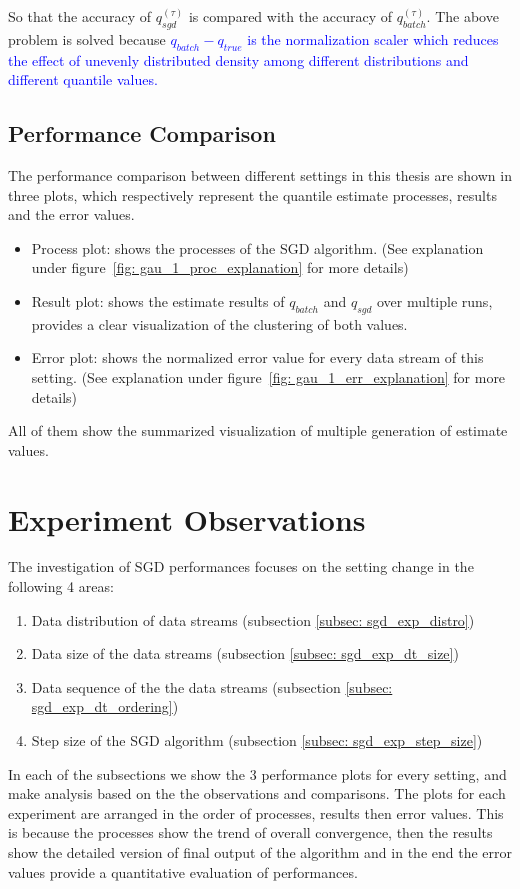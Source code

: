 So that the accuracy of $q_{sgd}^{(\tau)}$ is compared with the accuracy of $q_{batch}^{(\tau)}$. The above problem is solved because 
\textcolor{blue}{
    $
    q_{batch} - q_{true}
    $
    is the normalization scaler which reduces the effect of unevenly distributed density among different distributions and different quantile values.
}

\subsection{Performance Comparison}
The performance comparison between different settings in this thesis are shown in three plots, which respectively represent
the quantile estimate processes, results and the error values.
\begin{itemize}
    \item Process plot: shows the processes of the SGD algorithm. (See explanation under figure~\ref{fig: gau_1_proc_explanation} for more details)
    \item Result plot: shows the estimate results of $q_{batch}$ and $q_{sgd}$ over multiple runs, provides a clear visualization of the clustering of both values.
    \item Error plot: shows the normalized error value for every data stream of this setting. (See explanation under figure~\ref{fig: gau_1_err_explanation} for more details)
\end{itemize}

All of them show the summarized visualization of multiple generation of estimate values.


\pagebreak
\section{Experiment Observations}
\label{sec: observations}

The investigation of SGD performances focuses on the setting change in the following 4 areas:
    \begin{enumerate}
        \item Data distribution of data streams (subsection \ref{subsec: sgd_exp_distro})
        \item Data size of the data streams (subsection \ref{subsec: sgd_exp_dt_size})
        \item Data sequence of the the data streams  (subsection \ref{subsec: sgd_exp_dt_ordering})
        \item Step size of the SGD algorithm (subsection \ref{subsec: sgd_exp_step_size})
    \end{enumerate}
In each of the subsections we show the 3 performance plots for every setting, and make analysis based on the the observations and comparisons. The plots for each experiment are arranged in the order of processes, results then error values. This is because the processes show the trend of overall convergence, then the results show the detailed version of final output of the algorithm and in the end the error values provide a quantitative evaluation of performances. 

